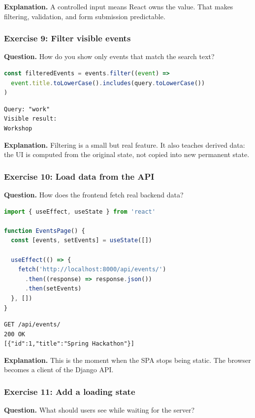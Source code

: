 \documentclass[11pt,a4paper]{article}
\begin{document}
\textbf{Explanation.} A controlled input means React owns the value. That makes filtering, validation, and form submission predictable.

\subsubsection*{Exercise 9: Filter visible events}
\textbf{Question.} How do you show only events that match the search text?

\begin{lstlisting}[style=code, language=JavaScript]
const filteredEvents = events.filter((event) =>
  event.title.toLowerCase().includes(query.toLowerCase())
)
\end{lstlisting}

\begin{lstlisting}[style=terminal]
Query: "work"
Visible result:
Workshop
\end{lstlisting}

\textbf{Explanation.} Filtering is a small but real feature. It also teaches derived data: the UI is computed from the original state, not copied into new permanent state.

\subsubsection*{Exercise 10: Load data from the API}
\textbf{Question.} How does the frontend fetch real backend data?

\begin{lstlisting}[style=code, language=JavaScript]
import { useEffect, useState } from 'react'

function EventsPage() {
  const [events, setEvents] = useState([])

  useEffect(() => {
    fetch('http://localhost:8000/api/events/')
      .then((response) => response.json())
      .then(setEvents)
  }, [])
}
\end{lstlisting}

\begin{lstlisting}[style=terminal]
GET /api/events/
200 OK
[{"id":1,"title":"Spring Hackathon"}]
\end{lstlisting}

\textbf{Explanation.} This is the moment when the SPA stops being static. The browser becomes a client of the Django API.

\subsubsection*{Exercise 11: Add a loading state}
\textbf{Question.} What should users see while waiting for the server?
\end{document}
